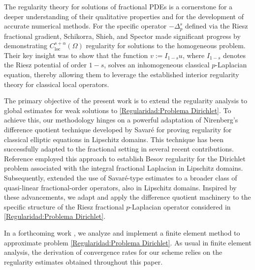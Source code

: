 \documentclass[]{amsart}
\theoremstyle{definition}
\theoremstyle{definition}
\theoremstyle{remark}
\numberwithin{equation}{section}
\begin{document}
	
	The regularity theory for solutions of fractional PDEs is a cornerstone for a deeper understanding of their qualitative properties and for the development of accurate numerical methods. For the specific operator \( -\Delta^{s}_{p} \) defined via the Riesz fractional gradient, Schikorra, Shieh, and Spector \cite{schikorra2018regularity} made significant progress by demonstrating \( C_{\text{loc}}^{s+\alpha}(\Omega) \) regularity for solutions to the homogeneous problem. Their key insight was to show that the function \( v := I_{1-s}u \), where \( I_{1-s} \) denotes the Riesz potential of order \( 1-s \), solves an inhomogeneous classical \( p \)-Laplacian equation, thereby allowing them to leverage the established interior regularity theory for classical local operators.
	
	The primary objective of the present work is to extend the regularity analysis to 
    global
    estimates for weak solutions to \eqref{Regularidad:Problema Dirichlet}.
    To achieve this, our methodology hinges on a powerful adaptation of Nirenberg's difference quotient technique developed by Savaré \cite{savare1998regularity} for proving regularity for classical elliptic equations in Lipschitz domains.
    This technique has been successfully adapted to the fractional setting in several recent contributions. 
    Reference
    \cite{borthagaray2023besov} employed this approach to establish Besov regularity for the Dirichlet problem associated with the integral fractional Laplacian in Lipschitz domains. Subsequently, 
    \cite{borthagaray2024quasi} extended the use of Savaré-type estimates to a broader class of quasi-linear fractional-order operators, also in Lipschitz domains. Inspired by these advancements, we adapt and apply the difference quotient machinery to the specific structure of the Riesz fractional \( p \)-Laplacian operator considered in \eqref{Regularidad:Problema Dirichlet}.

In a forthcoming work \cite{BDPR25+EF}, we analyze and implement a finite element method to approximate problem \eqref{Regularidad:Problema Dirichlet}. As usual in finite element analysis, the derivation of convergence rates for our scheme relies on the regularity estimates obtained throughout this paper.
\end{document}
